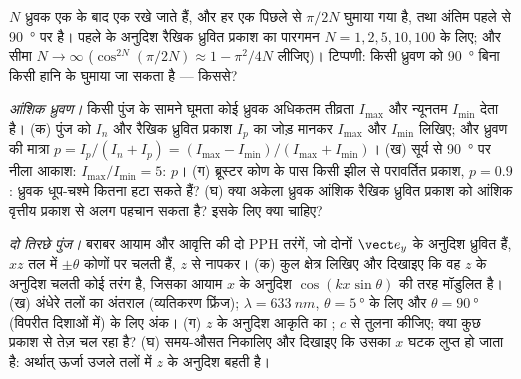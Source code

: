 \begin{exercise}[$\star\star$]\label{exo:b2:plane-waves-polarization:8}
$N$ ध्रुवक एक के बाद एक रखे जाते हैं, और हर एक पिछले से
$\pi/2N$ घुमाया गया है, तथा अंतिम पहले से \qty{90}{\degree} पर है। पहले के अनुदिश
रैखिक ध्रुवित प्रकाश का पारगमन
$N = 1, 2, 5, 10, 100$ के लिए; और सीमा $N \to \infty$ ($\cos^{2N}(\pi/2N) \approx
1 - \pi^2/4N$ लीजिए)। टिप्पणी: किसी ध्रुवण को \qty{90}{\degree} बिना किसी हानि के
घुमाया जा सकता है --- किससे?
\end{exercise}

\begin{exercise}[$\star\star$]\label{exo:b2:plane-waves-polarization:9}
\emph{आंशिक ध्रुवण।} किसी पुंज के सामने घूमता कोई ध्रुवक
अधिकतम तीव्रता $I_{\max}$ और न्यूनतम $I_{\min}$ देता है। (क) पुंज को
 $I_n$ और रैखिक ध्रुवित प्रकाश $I_p$ का जोड़ मानकर
$I_{\max}$ और $I_{\min}$ लिखिए; और ध्रुवण की मात्रा $p = I_p/(I_n + I_p) =
(I_{\max} - I_{\min})/(I_{\max} + I_{\min})$। (ख) सूर्य से \qty{90}{\degree} पर नीला आकाश:
$I_{\max}/I_{\min} = 5$: $p$। (ग) ब्रूस्टर कोण के पास किसी झील से परावर्तित
प्रकाश, $p = 0.9$: ध्रुवक धूप-चश्मे कितना हटा सकते हैं?
(घ) क्या अकेला ध्रुवक आंशिक रैखिक ध्रुवित प्रकाश को आंशिक वृत्तीय
प्रकाश से अलग पहचान सकता है? इसके लिए क्या चाहिए?
\end{exercise}

\begin{exercise}[$\star\star\star$]\label{exo:b2:plane-waves-polarization:10}
\emph{दो तिरछे पुंज।} बराबर आयाम और आवृत्ति की दो PPH तरंगें,
जो दोनों $\vect e_y$ के अनुदिश ध्रुवित हैं, $xz$ तल में
$\pm\theta$ कोणों पर चलती हैं, $z$ से नापकर। (क) कुल क्षेत्र लिखिए और दिखाइए कि वह
$z$ के अनुदिश चलती कोई तरंग है, जिसका आयाम $x$ के अनुदिश
$\cos(kx\sin\theta)$ की तरह मॉडुलित है। (ख) अंधेरे तलों का अंतराल (व्यतिकरण
फ्रिंज); $\lambda = \qty{633}{nm}$, $\theta = \qty{5}{\degree}$ के लिए और
$\theta = \qty{90}{\degree}$ (विपरीत दिशाओं में) के लिए अंक। (ग) $z$ के अनुदिश आकृति का
; $c$ से तुलना कीजिए; क्या कुछ प्रकाश से तेज़
चल रहा है? (घ) समय-औसत  निकालिए और दिखाइए कि उसका
$x$ घटक लुप्त हो जाता है: अर्थात् ऊर्जा उजले तलों में $z$ के अनुदिश
बहती है।
\end{exercise}

